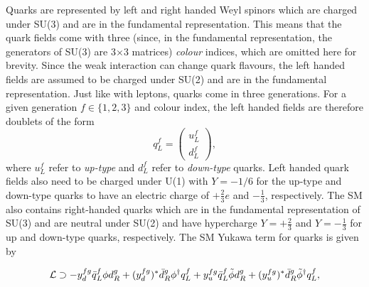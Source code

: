 Quarks are represented by left and right handed Weyl spinors which are charged under SU(3) and are in the fundamental representation. This means that the quark fields come with three (since, in the fundamental representation, the generators of SU(3) are 3$\times$3 matrices) \textit{colour} indices, which are omitted here for brevity. Since the weak interaction can change quark flavours, the left handed fields are assumed to be charged under SU(2) and are in the fundamental representation. Just like with leptons, quarks come in three generations. For a given generation $f\in\{1,2,3\}$ and colour index, the left handed fields are therefore doublets of the form
\begin{equation}
    q_L^f=\begin{pmatrix}
        u_L^f\\
        d_L^f
    \end{pmatrix},
\end{equation}
where $u_L^f$ refer to \textit{up-type} and $d_L^f$ refer to \textit{down-type} quarks. Left handed quark fields also need to be charged under U(1) with $Y=-1/6$ for the up-type and down-type quarks to have an electric charge of $+\frac{2}{3}e$ and $-\frac{1}{3}$, respectively. The SM also contains right-handed quarks which are in the fundamental representation of SU(3) and are neutral under SU(2) and have hypercharge $Y=+\frac{2}{3}$ and $Y=-\frac{1}{3}$ for up and down-type quarks, respectively. The SM Yukawa term for quarks is given by 

\begin{equation}
    \mathcal{L}\supset-y_d^{fg}\bar{q}{}_L^f\phi d_R^g+(y_d^{fg})^*\bar{d}{}_R^g\phi^{\dagger}q_L^f+y_u^{fg}\bar{q}{}_L^f\tilde{\phi} d_R^g+(y_u^{fg})^*\bar{d}{}_R^g\tilde{\phi}{}^{\dagger}q_L^f,
\end{equation}

